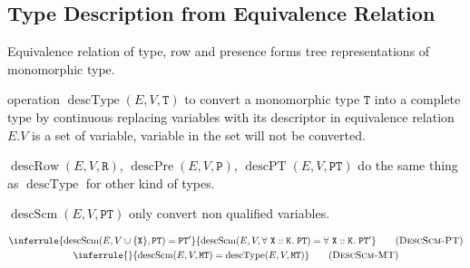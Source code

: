 \documentclass{report}
\newcommand{\code}{\mathtt}
\newcommand{\ruleTag}[1]{\label{#1}\tag{\textsc{#1}}}
\DeclareMathOperator{\describeScheme}{descScm}
\DeclareMathOperator{\describeType}{descType}
\DeclareMathOperator{\describeRow}{descRow}
\DeclareMathOperator{\describePresence}{descPre}
\DeclareMathOperator{\describePresenceWithType}{descPT}
\begin{document}
\subsection{Type Description from Equivalence Relation}

Equivalence relation of type, row and presence forms tree representations of monomorphic type.

operation \(\describeType(E, V, \code{T})\) to convert a monomorphic type \(\code{T}\) into a complete type by continuous replacing variables with its descriptor in equivalence relation \(E\).\(V\) is a set of variable, variable in the set will not be converted.

\(\describeRow(E, V, \code{R})\), \(\describePresence(E, V, \code{P})\), \(\describePresenceWithType(E, V, \code{PT})\) do the same thing as \(\describeType\) for other kind of types.

\(\describeScheme(E, V, \code{PT})\) only convert non qualified variables.

\begin{gather}
\inferrule
{\describeScheme(E, V \cup \{\code{X}\}, \code{PT}) = \code{PT}'}
{\describeScheme(E, V, \forall\ \code{X} :: \code{K} .\ \code{PT}) = \forall\ \code{X} :: \code{K} .\ \code{PT}'}
\ruleTag{DescScm-PT}
\\
\inferrule
{}
{\describeScheme(E, V, \code{MT}) = \describeType(E, V, \code{MT})}
\ruleTag{DescScm-MT}
\end{gather}
\end{document}
